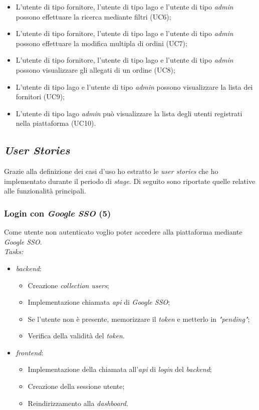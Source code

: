\begin{itemize}
\begin{itemize}
      \item L'utente di tipo fornitore, l'utente di tipo lago e l'utente di tipo \emph{admin} possono effettuare la ricerca mediante filtri (UC6);
      \item L'utente di tipo fornitore, l'utente di tipo lago e l'utente di tipo \emph{admin} possono effettuare la modifica multipla di ordini (UC7);
      \item L'utente di tipo fornitore, l'utente di tipo lago e l'utente di tipo \emph{admin} possono visualizzare gli allegati di un ordine (UC8);
      \item L'utente di tipo lago e l'utente di tipo \emph{admin} possono visualizzare la lista dei fornitori (UC9);
      \item L'utente di tipo lago \emph{admin} può visualizzare la lista degli utenti registrati nella piattaforma (UC10).
    \end{itemize}
\end{itemize}

\subsection{\emph{User Stories}}
Grazie alla definizione dei casi d'uso ho estratto le \emph{user stories} che ho implementato durante il periodo di \emph{stage}. Di seguito sono riportate quelle relative alle funzionalità principali.

\subsubsection{Login con \emph{Google SSO} (5)}
Come utente non autenticato voglio poter accedere alla piattaforma mediante \emph{Google SSO}. \\
\emph{Tasks:}
\begin{itemize}
  \item \emph{\gls{backend}}:
    \begin{itemize}
      \item Creazione \emph{collection users};
      \item Implementazione chiamata \emph{\acrshort{api}} di \emph{Google SSO};
      \item Se l'utente non è presente, memorizzare il \emph{token} e metterlo in \emph{"pending"};
      \item Verifica della validità del \emph{token}.
    \end{itemize}
  \item \emph{\gls{frontend}}:
    \begin{itemize}
      \item Implementazione della chiamata all'\emph{\acrshort{api}} di \emph{login} del \emph{\gls{backend}};
      \item Creazione della sessione utente;
      \item Reindirizzamento alla \emph{dashboard}.
    \end{itemize}
\end{itemize}

